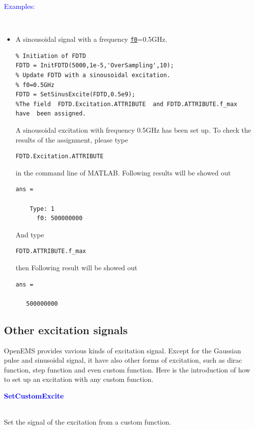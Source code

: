 	\textcolor{blue}{\begin{large}Examples:\end{large}}\\
\begin{itemize}
\item A sinousoidal signal with a  frequency \hyperref[para:sin_f0]{\texttt{f0}}=0.5GHz. 
\begin{lstlisting}
% Initiation of FDTD 
FDTD = InitFDTD(5000,1e-5,'OverSampling',10);
% Update FDTD with a sinousoidal excitation. 
% f0=0.5GHz
FDTD = SetSinusExcite(FDTD,0.5e9);
%The field  FDTD.Excitation.ATTRIBUTE  and FDTD.ATTRIBUTE.f_max have  been assigned.
\end{lstlisting}
A sinousoidal excitation with frequency 0.5GHz has been set up. 
To check the results of the assignment, please type 
\begin{lstlisting}
FDTD.Excitation.ATTRIBUTE
\end{lstlisting}
in the command line of MATLAB. Following results will be showed out
\begin{lstlisting}
ans = 

    Type: 1
      f0: 500000000
\end{lstlisting}
And type
\begin{lstlisting}
FDTD.ATTRIBUTE.f_max
\end{lstlisting}
then Following result will be showed out
\begin{lstlisting}
ans =

   500000000
\end{lstlisting}
\end{itemize}

    \subsection{Other excitation signals}\label{subsec:Other excitation signals}
OpenEMS provides vavious kinds of excitation signal. Except for the Gaussian pulse and sinusoidal signal, it have also other forms of excitation, such as dirac function, step function and even custom function. Here is the introduction of how to set up an excitation with any custom function.

\textcolor{blue}{\begin{large}\textbf{SetCustomExcite}	\end{large}} \label{func:SetCustomExcite}\\
	  Set the signal of the excitation from a custom function.


